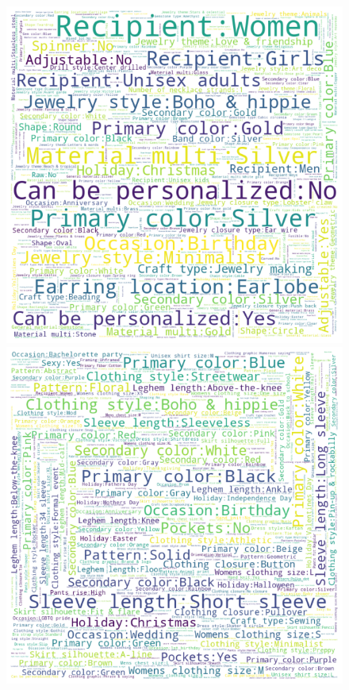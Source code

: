 \documentclass[11pt, dvipdfmx]{article}
\begin{document}
\begin{figure}
    \centering
    \includegraphics[bb=-220 0 -110 100]{submissions/in_session_ranking/figs/jewelry.png}
    \includegraphics[bb=-110 0 0 100]{submissions/in_session_ranking/figs/clothing.png}

\end{figure}
\end{document}
